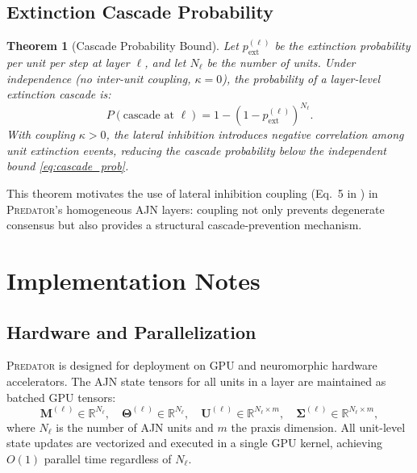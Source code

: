 \documentclass[12pt,a4paper]{article}
\newtheorem{theorem}{Theorem}[section]
\newcommand{\PREDATOR}{\textsc{Predator}}
\begin{document}
\subsection{Extinction Cascade Probability}

\begin{theorem}[Cascade Probability Bound]
\label{thm:cascade}
Let $p_{\text{ext}}^{(\ell)}$ be the extinction probability per unit per step
at layer $\ell$, and let $N_\ell$ be the number of units. Under independence
(no inter-unit coupling, $\kappa=0$), the probability of a layer-level
extinction cascade is:
\begin{equation}
  P(\text{cascade at }\ell) = 1 - (1 - p_{\text{ext}}^{(\ell)})^{N_\ell}.
  \label{eq:cascade_prob}
\end{equation}
With coupling $\kappa > 0$, the lateral inhibition introduces negative
correlation among unit extinction events, reducing the cascade probability
below the independent bound \eqref{eq:cascade_prob}.
\end{theorem}

This theorem motivates the use of lateral inhibition coupling (Eq.~5 in
\cite{tapiador2024annpsi}) in \PREDATOR's homogeneous AJN layers: coupling
not only prevents degenerate consensus but also provides a structural
cascade-prevention mechanism.

\section{Implementation Notes}
\label{sec:implementation}

\subsection{Hardware and Parallelization}

\PREDATOR{} is designed for deployment on GPU and neuromorphic hardware
accelerators. The AJN state tensors for all units in a layer are maintained
as batched GPU tensors:
\[
  \mathbf{M}^{(\ell)} \in \mathbb{R}^{N_\ell},\quad
  \boldsymbol{\Theta}^{(\ell)} \in \mathbb{R}^{N_\ell},\quad
  \mathbf{U}^{(\ell)} \in \mathbb{R}^{N_\ell \times m},\quad
  \mathbf{\Sigma}^{(\ell)} \in \mathbb{R}^{N_\ell \times m},
\]
where $N_\ell$ is the number of AJN units and $m$ the praxis dimension.
All unit-level state updates are vectorized and executed in a single GPU
kernel, achieving $O(1)$ parallel time regardless of $N_\ell$.
\end{document}
